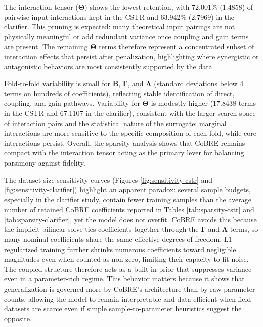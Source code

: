 \documentclass{article}
\begin{document}
The interaction tensor ($\mathbf{\Theta}$) shows the lowest retention, with 72.001\% (1.4858) of pairwise input interactions kept in the CSTR and 63.942\% (2.7969) in the clarifier. This pruning is expected: many theoretical input pairings are not physically meaningful or add redundant variance once coupling and gain terms are present. The remaining $\mathbf{\Theta}$ terms therefore represent a concentrated subset of interaction effects that persist after penalization, highlighting where synergistic or antagonistic behaviors are most consistently supported by the data.

Fold-to-fold variability is small for $\mathbf{B}$, $\mathbf{\Gamma}$, and $\mathbf{\Lambda}$ (standard deviations below 4 terms on hundreds of coefficients), reflecting stable identification of direct, coupling, and gain pathways. Variability for $\mathbf{\Theta}$ is modestly higher (17.8438 terms in the CSTR and 67.1107 in the clarifier), consistent with the larger search space of interaction pairs and the statistical nature of the surrogate: marginal interactions are more sensitive to the specific composition of each fold, while core interactions persist. Overall, the sparsity analysis shows that CoBRE remains compact with the interaction tensor acting as the primary lever for balancing parsimony against fidelity.

The dataset-size sensitivity curves (Figures \ref{fig:sensitivity-cstr} and \ref{fig:sensitivity-clarifier}) highlight an apparent paradox: several sample budgets, especially in the clarifier study, contain fewer training samples than the average number of retained CoBRE coefficients reported in Tables \ref{tab:sparsity-cstr} and \ref{tab:sparsity-clarifier}, yet the model does not overfit. CoBRE avoids this because the implicit bilinear solve ties coefficients together through the $\mathbf{\Gamma}$ and $\mathbf{\Lambda}$ terms, so many nominal coefficients share the same effective degrees of freedom. L1-regularized training further shrinks numerous coefficients toward negligible magnitudes even when counted as non-zero, limiting their capacity to fit noise. The coupled structure therefore acts as a built-in prior that suppresses variance even in a parameter-rich regime. This behavior matters because it shows that generalization is governed more by CoBRE's architecture than by raw parameter counts, allowing the model to remain interpretable and data-efficient when field datasets are scarce even if simple sample-to-parameter heuristics suggest the opposite.
\end{document}
